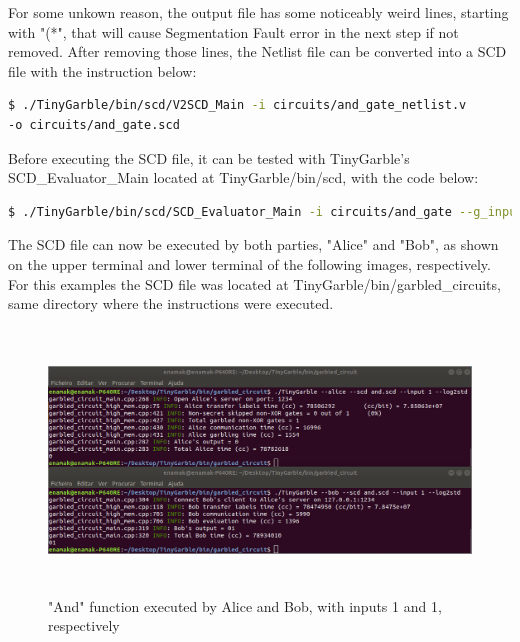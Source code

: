 \begin{refsection}
For some unkown reason, the output file has some noticeably weird lines, starting with "(*", that will cause Segmentation Fault error in the next step if not removed.
After removing those lines, the Netlist file can be converted into a SCD file with the instruction below:

\begin{lstlisting}[caption={Installation of Yosys-abc}, language=bash, captionpos=b] 
$ ./TinyGarble/bin/scd/V2SCD_Main -i circuits/and_gate_netlist.v 
-o circuits/and_gate.scd		
\end{lstlisting}

Before executing the SCD file, it can be tested with TinyGarble's SCD\_Evaluator\_Main located at TinyGarble/bin/scd, with the code below:

\begin{lstlisting}[caption={Testing a SCD file}, language=bash, captionpos=b] 
$ ./TinyGarble/bin/scd/SCD_Evaluator_Main -i circuits/and_gate --g_input 1 --e_input 0
\end{lstlisting}

\newpage

The SCD file can now be executed by both parties, "Alice" and "Bob", as shown on the upper terminal and lower terminal of the following images, respectively.
For this examples the SCD file was located at TinyGarble/bin/garbled\_circuits, same directory where the instructions were executed.

\begin{figure}[H]
	\centering
	\includegraphics[width=1\textwidth, height=7cm]{./sdf/secure_multiparty_computation/figures/tinygarble_and_a.png}
    \caption{"And" function executed by Alice and Bob, with inputs 1 and 1, respectively}\label{fig:tinygarble_and_a}
\end{figure}


\end{refsection}
